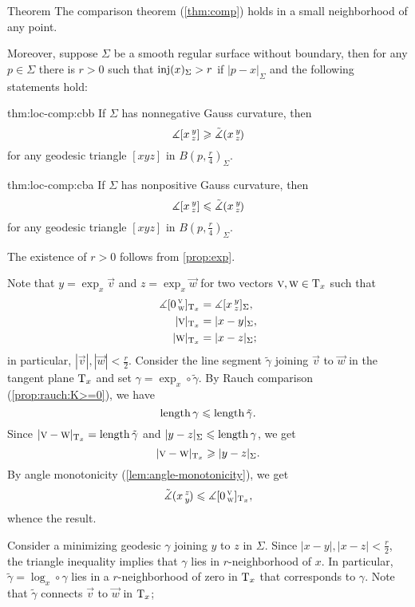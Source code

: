 \begin{thm}{Theorem}\label{thm:loc-comp}
The comparison theorem (\ref{thm:comp}) holds in a small neighborhood of any point.

Moreover, suppose $\Sigma$ be a smooth regular surface without boundary,
then for any $p\in \Sigma$ there is $r>0$ such that $\mathop{\rm inj}\nolimits(x)_\Sigma>r$ if $|p-x|_\Sigma$ and the following statements hold:

\begin{subthm}{thm:loc-comp:cbb}
If $\Sigma$ has nonnegative Gauss curvature, then 
\[\measuredangle[x\,{}^{y}_{z}]\geqslant\tilde\measuredangle(x\,{}^{y}_{z}\hspace{-0.2ex})\]
for any geodesic triangle $[xyz]$ in $B(p,\tfrac r4)_\Sigma$.
\end{subthm}

\begin{subthm}{thm:loc-comp:cba}
If $\Sigma$ has nonpositive Gauss curvature, then 
\[\measuredangle[x\,{}^{y}_{z}]\leqslant\tilde\measuredangle(x\,{}^{y}_{z}\hspace{-0.2ex})\]
for any geodesic triangle $[xyz]$  in $B(p,\tfrac r4)_\Sigma$.
\end{subthm}
\end{thm}


The existence of $r>0$ follows from \ref{prop:exp}.

Note that $y=\exp_x\vec v$ and $z=\exp_x\vec w$ for two vectors $\textsc v,\textsc w\in\mathrm{T}_x$ such that 
\begin{align*}
\measuredangle[0\,{}^{\textsc v}_{\textsc w}]_{\mathrm{T}_x}&=\measuredangle[x\,{}^{y}_{z}]_\Sigma,
\\
|\textsc v|_{\mathrm{T}_x}&=|x-y|_\Sigma, 
\\
|\textsc w|_{\mathrm{T}_x}&=|x-z|_\Sigma;
\end{align*}
in particular, $|\vec v|, |\vec w|< \tfrac r2$.
Consider the line segment $\tilde \gamma$ joining $\vec v$ to $\vec w$ in the tangent plane $\mathrm{T}_x$ and set $\gamma=\exp_x\circ\tilde \gamma$.
By Rauch comparison (\ref{prop:rauch:K>=0}), we have
\[\mathop{\rm length}\nolimits\gamma\leqslant \mathop{\rm length}\nolimits \tilde \gamma.\]
Since $|\textsc v-\textsc w|_{\mathrm{T}_x}=\mathop{\rm length}\nolimits\tilde \gamma$ and $|y-z|_{\Sigma}\leqslant \mathop{\rm length}\nolimits\gamma$, we get 
\[|\textsc v-\textsc w|_{\mathrm{T}_x}\geqslant |y-z|_\Sigma.\]
By angle monotonicity (\ref{lem:angle-monotonicity}), we get
\[\tilde\measuredangle(x\,{}^{z}_{y}\hspace{-0.2ex})\leqslant\measuredangle[0\,{}^{\textsc v}_{\textsc w}]_{\mathrm{T}_x},\]
whence the result.

Consider a minimizing geodesic $\gamma$ joining $y$ to $z$ in $\Sigma$.
Since $|x-y|,|x-z|<\tfrac r2$, the triangle inequality implies that $\gamma$ lies in $r$-neighborhood of $x$.
In particular, $\tilde \gamma=\log_x\circ\gamma$ lies in a $r$-neighborhood of zero in $\mathrm{T}_x$ that corresponds to $\gamma$.
Note that $\tilde\gamma$ connects $\vec v$ to $\vec w$ in $\mathrm{T}_x$;

